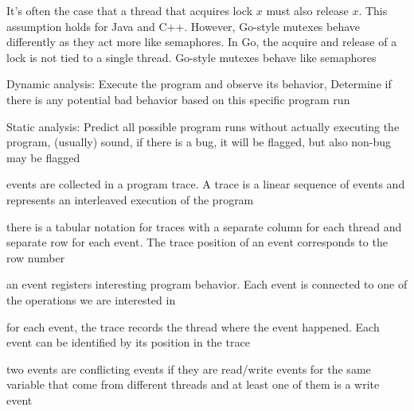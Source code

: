 \documentclass[landscape, a4paper]{article}
\begin{document}
\begin{minipage}[t]{0.2\linewidth}
	\begin{betterlist}
		\item It's often the case that a thread that acquires lock $x$ must also release $x$. This assumption holds for Java and C++. However, Go-style mutexes behave differently as they act more like semaphores. In Go, the acquire and release of a lock is not tied to a single thread. Go-style mutexes behave like semaphores
	\end{betterlist}
	\begin{betterlist}
		\item \alert{Dynamic analysis}: Execute the program and observe its behavior, Determine if there is any potential bad behavior based on this specific program run
		\item \alert{Static analysis}: Predict all possible program runs without actually executing the program, (usually) sound,  if there is a bug, it will be flagged, but also non-bug may be flagged
		\item events are collected in a program \alert{trace}. A trace is a linear sequence of events and represents an interleaved execution of the program
		\begin{betterlist}
			\item there is a \alert{tabular notation} for traces with a separate \alert{column} for each \alert{thread} and separate \alert{row} for each \alert{event}. The trace \alert{position} of an event corresponds to the row number
		\end{betterlist}
		\item an \alert{event} registers interesting program behavior. Each event is connected to one of the operations we are interested in
		\begin{betterlist}
			\item for each event, the trace records the \alert{thread} where the event happened. Each event can be identified by its position in the trace
			\item two events are \alert{conflicting events} if they are read/write events for the same variable that come from different threads and at least one of them is a write event

\end{betterlist}
\end{betterlist}
\end{minipage}
\end{document}
